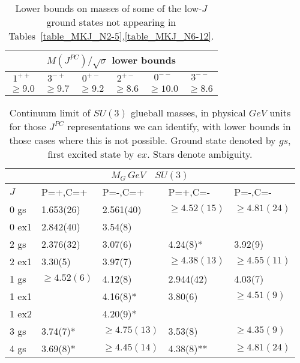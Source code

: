 \documentclass[12pt]{article}
\begin{document}
\clearpage


\begin{table}[htb]
\centering
\begin{tabular}{|cccccc|} \hline
\multicolumn{6}{|c|}{$M(J^{PC})/\surd\sigma$ lower bounds} \\ \hline
  $1^{++}$ &  $3^{-+}$ & $0^{+-}$& $2^{+-}$ & $0^{--}$ & $3^{--}$ \\ \hline
 $\ge 9.0$  & $\ge 9.7$  &$\ge 9.2$   & $\ge 8.6$  &$\ge 10.0$   & $\ge 8.6$   \\ \hline
\end{tabular}
\caption{Lower bounds on masses of some of the low-$J$ ground states not
  appearing in Tables~\ref{table_MKJ_N2-5},\ref{table_MKJ_N6-12}.}
\label{table_MKJ_lowbound}
\end{table}


\begin{table}[htb]
\centering
\begin{tabular}{|l|l|l|l|l|} \hline
\multicolumn{5}{|c|}{$M_G \, GeV \quad SU(3)$} \\ \hline
  $J$   & P=+,C=+ & P=-,C=+ &  P=+,C=-   &  P=-,C=-   \\ \hline
 0 gs   & 1.653(26)   & 2.561(40) & $\ge 4.52(15)$ &  $\ge 4.81(24)$   \\
 0 ex1  & 2.842(40)   & 3.54(8)   &               &    \\
 2 gs   & 2.376(32)   & 3.07(6)   & 4.24(8)*      &  3.92(9)   \\
 2 ex1  & 3.30(5)     & 3.97(7)   & $\ge 4.38(13)$ & $\ge 4.55(11)$  \\
 1 gs   & $\ge 4.52(6)$ & 4.12(8)  & 2.944(42)    &  4.03(7)  \\ 
 1 ex1  &             & 4.16(8)*  & 3.80(6)       & $\ge 4.51(9)$    \\
 1 ex2  &             & 4.20(9)*  &               &    \\
 3 gs   & 3.74(7)*    &  $\ge 4.75(13)$ & 3.53(8)   & $\ge 4.35(9)$   \\
 4 gs   & 3.69(8)*    &  $\ge 4.45(14)$ & 4.38(8)** & $\ge 4.81(24)$   \\ \hline
\end{tabular}
\caption{Continuum limit of $SU(3)$ glueball masses, in physical $GeV$ units
  for those $J^{PC}$ representations we can identify, with lower bounds in those
  cases where this is not possible. Ground state denoted by $gs$,
  first excited state by $ex$. Stars denote ambiguity.}
\label{table_MJ_N3}
    \end{table}
\end{document}
